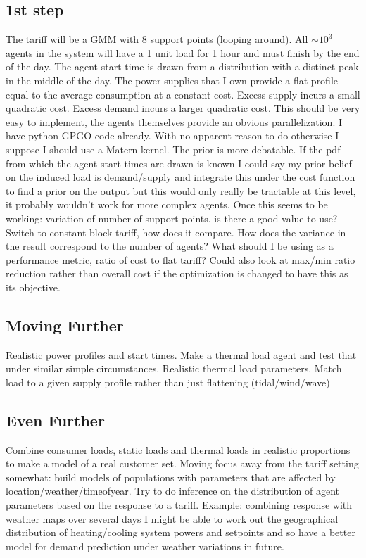 \documentclass[11pt]{article}
\begin{document}
\subsection{1st step}
The tariff will be a GMM with 8 support points (looping around). All $\sim 10^{3}$
agents in the system will have a 1 unit load for 1 hour and must finish by
the end of the day. The agent start time is drawn from a distribution with a
distinct peak in the middle of the day. The power supplies that I own provide a
flat profile equal to the average consumption at a constant cost. Excess supply
incurs a small quadratic cost. Excess demand incurs a larger quadratic cost.
This should be very easy to implement, the agents themselves provide an
obvious parallelization. I have python GPGO code already. With no apparent
reason to do otherwise I suppose I should use a Matern kernel. The prior is
more debatable. If the pdf from which the agent start times are drawn is known
I could say my prior belief on the induced load is demand/supply and integrate
this under the cost function to find a prior on the output but this would only
really be tractable at this level, it probably wouldn't work for more complex
agents.
Once this seems to be working: variation of number of support points. is
there a good value to use? Switch to constant block tariff, how does it compare.
How does the variance in the result correspond to the number of agents? What
should I be using as a performance metric, ratio of cost to flat tariff? Could also
look at max/min ratio reduction rather than overall cost if the optimization is
changed to have this as its objective.

\subsection{Moving Further}
Realistic power profiles and start times. Make a thermal load agent and test that
under similar simple circumstances. Realistic thermal load parameters. Match
load to a given supply profile rather than just flattening (tidal/wind/wave)
\subsection{Even Further}
Combine consumer loads, static loads and thermal loads in realistic proportions
to make a model of a real customer set.
Moving focus away from the tariff setting somewhat: build models of populations with parameters that are affected by location/weather/timeofyear. Try
to do inference on the distribution of agent parameters based on the response
to a tariff. Example: combining response with weather maps over several days
I might be able to work out the geographical distribution of heating/cooling
system powers and setpoints and so have a better model for demand prediction
under weather variations in future.

{}

\end{document}
